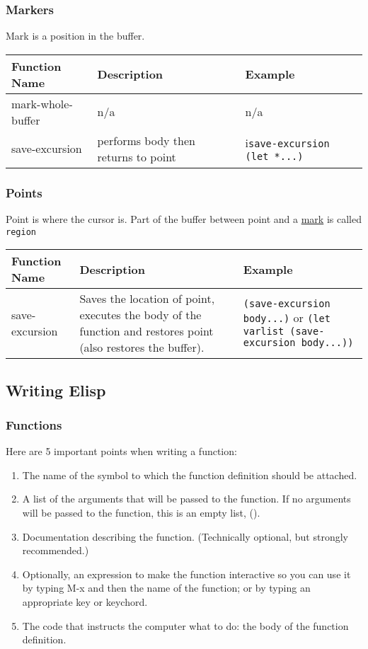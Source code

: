 \documentclass[12pt, letterpaper]{article}
\def\code#1{\texttt{#1}}
\begin{document}
\subsubsection{Markers}
\label{sssec:markers}
Mark is a position in the buffer.

\begin{tabular} {|L{0.2\textwidth}|L{0.4\textwidth}|L{0.4\textwidth}|}
  \hline
  \textbf{Function Name} &
  \textbf{Description} &
  \textbf{Example} \\\hline\hline
  \hline
  mark-whole-buffer & n/a & n/a \\\hline
  save-excursion & performs body then returns to point & i\code{save-excursion (let *...)} \\\hline
  \hline
\end{tabular}

\subsubsection{Points}
Point is where the cursor is. Part of the buffer between point and a \hyperref[sssec:markers]{mark} is called \code{region}

\begin{tabular} {|L{0.2\textwidth}|L{0.4\textwidth}|L{0.4\textwidth}|}
  \hline
  \textbf{Function Name} &
  \textbf{Description} &
  \textbf{Example} \\\hline\hline
  \hline
  save-excursion & Saves the location of point, executes the body of the function and restores point (also restores the buffer). &
  \code{(save-excursion
    body...)}
  or 
 \code{(let varlist
  (save-excursion
           body...))}\\
  \hline
\end{tabular}


\subsection{Writing Elisp}
\subsubsection{Functions}
Here are 5 important points when writing a function:

\begin{enumerate}
\item The name of the symbol to which the function definition should be attached.
\item A list of the arguments that will be passed to the function. If no arguments will be passed to the function, this is an empty list, (). 
\item Documentation describing the function. (Technically optional, but strongly recommended.)
\item Optionally, an expression to make the function interactive so you can use it by typing M-x and then the name of the function; or by typing an appropriate key or keychord.
\item The code that instructs the computer what to do: the body of the function definition.
\end{enumerate}
\end{document}
